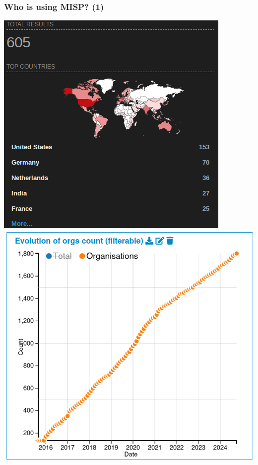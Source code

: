 \begin{frame}
    \frametitle{Who is using MISP? (1)}
    \begin{center}
        \includegraphics[scale=0.45]{misp-shodan.png}
        \includegraphics[scale=0.27]{org-count-misppriv.png}
    \end{center}
\end{frame}

